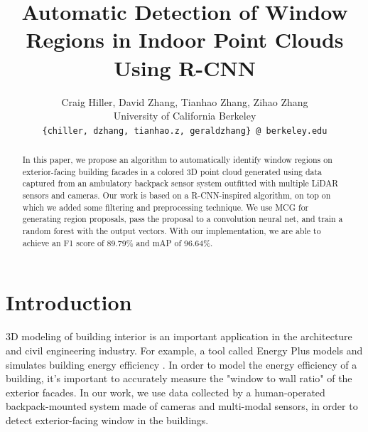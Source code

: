 \documentclass[10pt,twocolumn,letterpaper]{article}
\begin{document}
\title{Automatic Detection of Window Regions in Indoor Point Clouds Using R-CNN}

\author{Craig Hiller, David Zhang, Tianhao Zhang, Zihao Zhang\\
University of California Berkeley\\
{\tt\small \{chiller, dzhang, tianhao.z, geraldzhang\} @ berkeley.edu}
}

\maketitle

\begin{abstract}
In this paper, we propose an algorithm to automatically identify window regions on exterior-facing building facades in a colored 3D point cloud generated using data captured from an ambulatory backpack sensor system outfitted with multiple LiDAR sensors and cameras. Our work is based on a R-CNN-inspired algorithm, on top on which we added some filtering and preprocessing technique. We use MCG for generating region proposals, pass the proposal to a convolution neural net, and train a random forest with the output vectors. With our implementation, we are able to achieve an F1 score of 89.79\% and mAP of 96.64\%.

\end{abstract}

\section{Introduction}

3D modeling of building interior is an important application in the architecture and civil engineering industry. For example, a tool called Energy Plus models and simulates building energy efficiency \cite{rzhang}. In order to model the energy efficiency of a building, it's important to accurately measure the "window to wall ratio" of the exterior facades. In our work, we use data collected by a human-operated backpack-mounted system made of cameras and multi-modal sensors, in order to detect exterior-facing window in the buildings.
\end{document}
